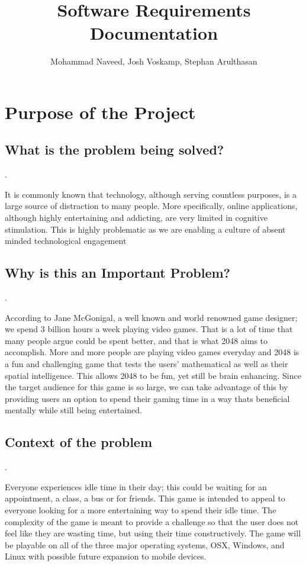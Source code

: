 \documentclass[12pt]{amsart}
\title{Software Requirements Documentation}
\author{Mohammad Naveed, Josh Voskamp, Stephan Arulthasan}
\begin{document}
\maketitle
\newpage
\tableofcontents
\newpage

\section{Purpose of the Project}
\subsection{What is the problem being solved?} 
.\par
It is commonly known that technology, although serving countless purposes, is a large source of distraction to many people. More specifically, online applications, although highly entertaining and addicting, are very limited in cognitive stimulation. This is highly problematic as we are enabling a culture of absent minded technological engagement
\subsection{Why is this an Important Problem?} 
.\par
According to Jane McGonigal, a well known and world renowned game designer; we spend 3 billion hours a week playing video games. That is a lot of time that many people argue could be spent better, and that is what 2048 aims to accomplish. More and more people are playing video games everyday and 2048 is a fun and challenging game that tests the users' mathematical as well as their spatial intelligence. This allows 2048 to be fun, yet still be brain enhancing. Since the target audience for this game is so large, we can take advantage of this by providing users an option to spend their gaming time in a way thats beneficial mentally while still being entertained.
\subsection{Context of the problem} 
.\par Everyone experiences idle time in their day; this could be waiting for an appointment, a class, a bus or for friends. This game is intended to appeal to everyone looking for a more entertaining way to spend their idle time. The complexity of the game is meant to provide a challenge so that the user does not feel like they are wasting time, but using their time constructively. The game will be playable on all of the three major operating systems, OSX, Windows, and Linux with possible future expansion to mobile devices.
\end{document}
